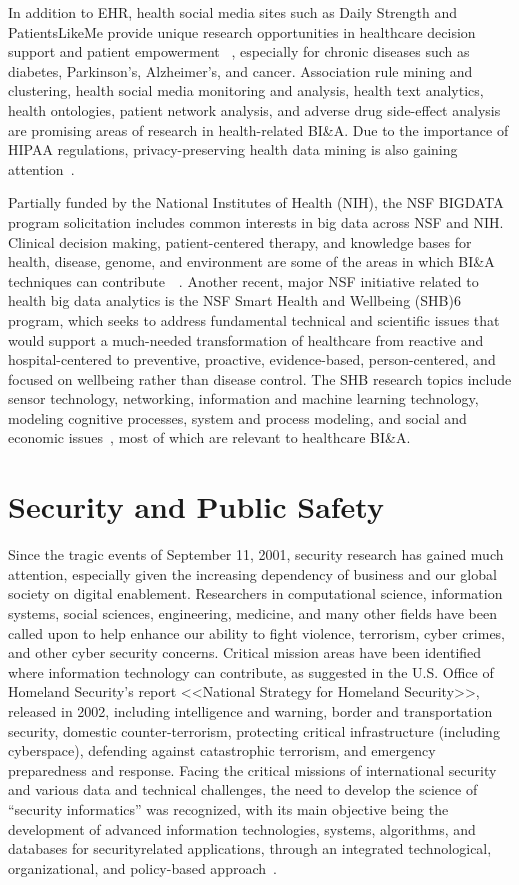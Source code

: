 In addition to EHR, health social media sites such as Daily
Strength and PatientsLikeMe provide unique research opportunities
in healthcare decision support and patient empowerment
~\cite{Miller:2012b}, especially for chronic diseases such as
diabetes, Parkinson’s, Alzheimer’s, and cancer. Association
rule mining and clustering, health social media monitoring
and analysis, health text analytics, health ontologies, patient
network analysis, and adverse drug side-effect analysis are
promising areas of research in health-related BI\&A. Due to
the importance of HIPAA regulations, privacy-preserving
health data mining is also gaining attention~\cite{Gelfand:2012}.

Partially funded by the National Institutes of Health (NIH),
the NSF BIGDATA program solicitation includes common
interests in big data across NSF and NIH. Clinical decision
making, patient-centered therapy, and knowledge bases for
health, disease, genome, and environment are some of the
areas in which BI\&A techniques can contribute~\cite{Chen:2011b}~\cite{Wactlar:2011}. Another recent, major NSF initiative
related to health big data analytics is the NSF Smart Health
and Wellbeing (SHB)6
program, which seeks to address
fundamental technical and scientific issues that would support
a much-needed transformation of healthcare from reactive and
hospital-centered to preventive, proactive, evidence-based,
person-centered, and focused on wellbeing rather than disease
control. The SHB research topics include sensor technology,
networking, information and machine learning technology,
modeling cognitive processes, system and process modeling,
and social and economic issues~\cite{Wactlar:2011}, most of
which are relevant to healthcare BI\&A.

\section*{Security and Public Safety}
Since the tragic events of September 11, 2001, security
research has gained much attention, especially given the
increasing dependency of business and our global society on
digital enablement. Researchers in computational science,
information systems, social sciences, engineering, medicine,
and many other fields have been called upon to help enhance
our ability to fight violence, terrorism, cyber crimes, and other
cyber security concerns. Critical mission areas have been
identified where information technology can contribute, as
suggested in the U.S. Office of Homeland Security’s report
<<National Strategy for Homeland Security>>, released in 2002,
including intelligence and warning, border and transportation
security, domestic counter-terrorism, protecting critical infrastructure
(including cyberspace), defending against catastrophic
terrorism, and emergency preparedness and response.
Facing the critical missions of international security and
various data and technical challenges, the need to develop the
science of “security informatics” was recognized, with its
main objective being the development of advanced information technologies, systems, algorithms, and databases for securityrelated applications, through an integrated technological,
organizational, and policy-based approach~\cite{Chen:2006}.

